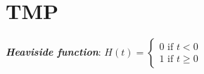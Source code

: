 \documentclass{article}
\begin{document}
\section{TMP}

\begin{definition}
\textbf{\emph{Heaviside function}}: $H(t)=
\begin{cases}
    0 \text{ if }t < 0\\
    1 \text{ if }t \geq 0
\end{cases}
$
\end{definition}
\end{document}
